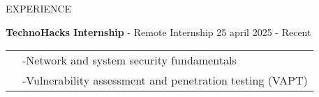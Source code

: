 \documentclass{resume}
\begin{document}
\begin{rSection}{EXPERIENCE}
     \begin{itemize}
        {\bf TechnoHacks Internship} - Remote Internship \hfill {25 april 2025 - Recent}\\
        \begin{tabular}{>{\bfseries}l l}
            \textbf{} & -Network and system security fundamentals \\ & -Vulnerability assessment and penetration testing (VAPT)

\end{tabular}
\end{itemize}
\end{rSection}
\end{document}
